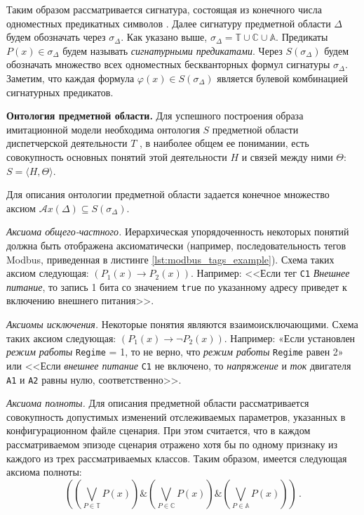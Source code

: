 Таким образом рассматривается сигнатура, состоящая из конечного числа одноместных предикатных символов \cite[стр. 17]{book:math_logic:guz}.
Далее сигнатуру предметной области $\Delta$ будем обозначать через $\sigma_\Delta$.
Как указано выше, $\sigma_\Delta = \mathbb{T} \cup \mathbb{C} \cup \mathbb{A}$.
Предикаты $P(x) \in \sigma_\Delta$ будем называть \textit{сигнатурными предикатами}.
Через $S(\sigma_\Delta)$ будем обозначать множество всех одноместных бескванторных формул сигнатуры $\sigma_\Delta$.
Заметим, что каждая формула $\varphi(x) \in S(\sigma_\Delta)$ является булевой комбинацией сигнатурных предикатов.


\textbf{Онтология предметной области.}
Для успешного построения образа имитационной модели необходима онтология $S$ предметной области
диспетчерской деятельности $T$ \cite{journal:vestnik_spbgu:ivakin, journal:vestnik_vgtu:shapkin},
в наиболее общем ее понимании, есть совокупность основных понятий этой деятельности $H$ и связей между ними $\Theta$:
$S=\langle H, \Theta\rangle$. 

Для описания онтологии предметной области задается конечное множество аксиом $\mathcal{A}x(\Delta) \subseteq S(\sigma_\Delta)$.
  
\textit{Аксиома общего-частного.}
Иерархическая упорядоченность некоторых понятий должна быть отображена аксиоматически (например, последовательность тегов Modbus, приведенная в листинге \ref{lst:modbus_tags_example}).
Схема таких аксиом следующая: $\left(P_1(x) \to P_2(x) \right)$.
Например: <<Если тег \texttt{C1} \textit{Внешнее питание}, то запись 1 бита со значением \texttt{true} по указанному адресу приведет к включению внешнего питания>>.

\textit{Аксиомы исключения.}
Некоторые понятия являются взаимоисключающими. Схема таких аксиом следующая:
$\left(P_1(x) \to \lnot P_2(x) \right)$.
Например:
«Если установлен \textit{режим работы} \texttt{Regime} = 1, то не верно, что \textit{режим работы} \texttt{Regime} равен 2»
или
<<Если \textit{внешнее питание} \texttt{C1} не включено, то \textit{напряжение} и \textit{ток} двигателя \texttt{A1} и \texttt{A2} равны нулю, соответственно>>.

\textit{Аксиома полноты.}
Для описания предметной области рассматривается совокупность допустимых изменений отслеживаемых параметров,
указанных в конфигурационном файле сценария. При этом считается, что в каждом рассматриваемом эпизоде сценария
отражено хотя бы по одному признаку из каждого из трех рассматриваемых классов.
Таким образом, имеется следующая аксиома полноты:
$$%
\left( \left(\bigvee_{P\in\mathbb{T}}P(x)\right) \& \left(\bigvee_{P\in\mathbb{C}}P(x)\right) \& \left(\bigvee_{P\in\mathbb{A}}P(x)\right) \right) \,.
$$

